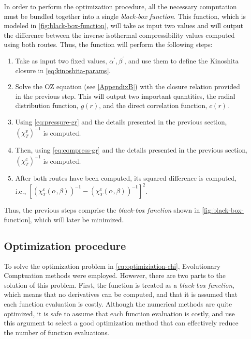 In order to perform the optimization procedure, all the necessary computation must be bundled together into a single \emph{black-box function}. This function, which is modeled in \autoref{fig:black-box-function}, will take as input two values and will output the difference between the inverse isothermal compressibility values computed using both routes. Thus, the function will perform the following steps:
\begin{enumerate}
    \item Take as input two fixed values, \(\alpha^{\prime}, \beta^{\prime}\), and use them to define the Kinoshita closure in \autoref{eq:kinoshita-params}.
    \item Solve the OZ equation (see \autoref{AppendixB}) with the closure relation provided in the previous step. This will output two important quantities, the radial distribution function, \(g(r)\), and the direct correlation function, \(c(r)\).
    \item Using \autoref{eq:pressure-gr} and the details presented in the previous section, \({\left(\chi_{T}^{v}\right)}^{-1}\) is computed.
    \item Then, using \autoref{eq:compress-gr} and the details presented in the previous section, \({\left(\chi_{T}^{c}\right)}^{-1}\) is computed.
    \item After both routes have been computed, its squared difference is computed, i.e., \({\left[ {\left(\chi_{T}^{c} \left(\alpha, \beta\right) \right)}^{-1} - {\left(\chi_{T}^{v} \left(\alpha, \beta\right) \right)}^{-1} \right]}^2 \).
\end{enumerate}
Thus, the previous steps comprise the \emph{black-box function} shown in 
\autoref{fig:black-box-function}, which will later be minimized.

\subsection{Optimization procedure}
To solve the optimization problem in \autoref{eq:optimiziation-chi}, Evolutionary 
Comptuation methods were employed. However, there are two parts to the solution of this 
problem. First, the function is treated as a \emph{black-box function}, which means 
that no derivatives can be computed, and that it is assumed that each function evaluation 
is costly. Although the numerical methods are quite optimized, it is safe to assume that 
each function evaluation is costly, and use this argument to select a good optimization 
method that can effectively reduce the number of function evaluations.

